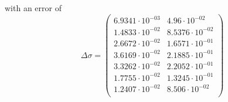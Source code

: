 \documentclass[]{article}
\begin{document}
with an error of
\begin{equation}
\Delta\sigma=
\begin{pmatrix}
   6.9341\cdot 10^{-03} & 4.96\cdot 10^{-02} \\
   1.4833\cdot 10^{-02} & 8.5376\cdot 10^{-02} \\
   2.6672\cdot 10^{-02} & 1.6571\cdot 10^{-01} \\
   3.6169\cdot 10^{-02} & 2.1885\cdot 10^{-01} \\
   3.3262\cdot 10^{-02} & 2.2052\cdot 10^{-01} \\
   1.7755\cdot 10^{-02} & 1.3245\cdot 10^{-01} \\
   1.2407\cdot 10^{-02} & 8.506\cdot 10^{-02} \\
\end{pmatrix}
\end{equation}


\pagebreak
\nocite{*}
\printbibliography
\end{document}
